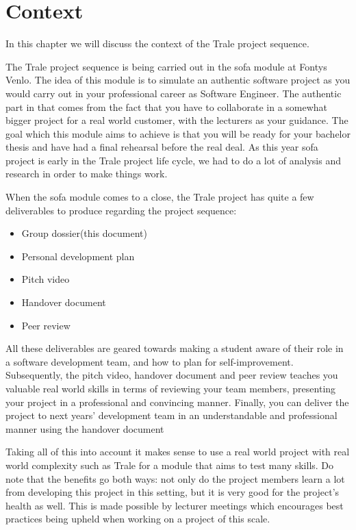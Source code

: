\chapter{Context}\label{ch:context}
In this chapter we will discuss the context of the Trale project sequence.

The Trale project sequence is being carried out in the \ac{sofa} module at Fontys Venlo.
The idea of this module is to simulate an authentic software project as you would carry out in your professional career
as Software Engineer.
The authentic part in that comes from the fact that you have to collaborate in a somewhat bigger project for a real
world customer, with the lecturers as your guidance.
The goal which this module aims to achieve is that you will be ready for your bachelor thesis and have had a final
rehearsal before the real deal.
As this year \ac{sofa} project is early in the Trale project life cycle, we had to do a lot of analysis and research in
order to make things work.

When the \ac{sofa} module comes to a close, the Trale project has quite a few deliverables to produce regarding the
project sequence:

\begin{itemize}
    \item Group dossier(this document)
    \item Personal development plan
    \item Pitch video
    \item Handover document
    \item Peer review
\end{itemize}

All these deliverables are geared towards making a student aware of their role in a software development team, and how
to plan for self-improvement.
Subsequently, the pitch video, handover document and peer review teaches you valuable real world skills in terms of
reviewing your team members, presenting your project in a professional and convincing manner.
Finally, you can deliver the project to next years' development team in an understandable and professional manner using
the handover document

Taking all of this into account it makes sense to use a real world project with real world complexity such as Trale
for a module that aims to test many skills.
Do note that the benefits go both ways: not only do the project members learn a lot from developing this project in
this setting, but it is very good for the project's health as well.
This is made possible by lecturer meetings which encourages best practices being upheld when working on a project of
this scale.
